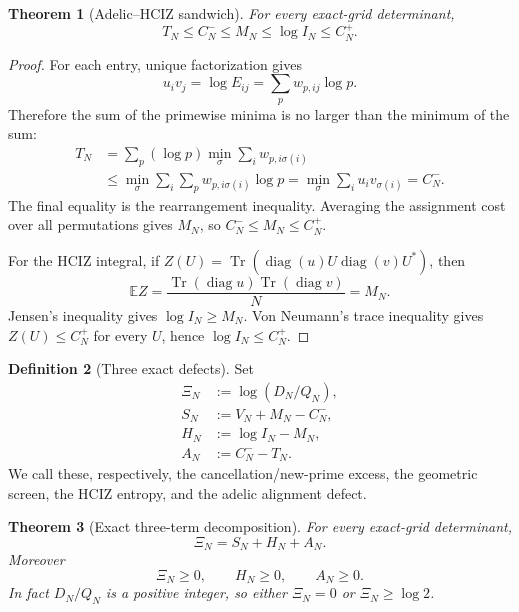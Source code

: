 \documentclass[11pt]{article}
\newcommand{\E}{\mathbb E}
\newcommand{\Tr}{\operatorname{Tr}}
\newcommand{\diag}{\operatorname{diag}}
\newcommand{\1}{\mathbf 1}
\theoremstyle{plain}
\newtheorem{theorem}{Theorem}[section]
\theoremstyle{definition}
\newtheorem{definition}[theorem]{Definition}
\theoremstyle{remark}
\begin{document}
\begin{theorem}[Adelic--HCIZ sandwich]\label{thm:sandwich}
For every exact-grid determinant,
\begin{equation}\label{eq:master-sandwich}
 \boxed{\quad
 T_N\le C_N^-\le M_N\le\log I_N\le C_N^+.
 \quad}
\end{equation}
\end{theorem}

\begin{proof}
For each entry, unique factorization gives
\[
 u_iv_j=\log E_{ij}=\sum_pw_{p,ij}\log p.
\]
Therefore the sum of the primewise minima is no larger than the minimum of
the sum:
\begin{align*}
 T_N
 &=\sum_p(\log p)\min_\sigma\sum_iw_{p,i\sigma(i)}\\
 &\le\min_\sigma\sum_i\sum_p w_{p,i\sigma(i)}\log p
 =\min_\sigma\sum_i u_iv_{\sigma(i)}=C_N^-.
\end{align*}
The final equality is the rearrangement inequality.  Averaging the assignment
cost over all permutations gives $M_N$, so $C_N^-\le M_N\le C_N^+$.

For the HCIZ integral, if
$Z(U)=\Tr(\diag(u)U\diag(v)U^*)$, then
\[
 \E Z=\frac{\Tr(\diag u)\Tr(\diag v)}N=M_N.
\]
Jensen's inequality gives $\log I_N\ge M_N$.  Von Neumann's trace inequality
gives $Z(U)\le C_N^+$ for every $U$, hence $\log I_N\le C_N^+$.
\end{proof}

\begin{definition}[Three exact defects]\label{def:defects}
Set
\begin{align}
 \Xi_N&:=\log(D_N/Q_N),\label{eq:Xi}\\
 S_N&:=V_N+M_N-C_N^-,\label{eq:screen-finite}\\
 H_N&:=\log I_N-M_N,\label{eq:entropy}\\
 A_N&:=C_N^--T_N.\label{eq:alignment}
\end{align}
We call these, respectively, the cancellation/new-prime excess, the geometric
screen, the HCIZ entropy, and the adelic alignment defect.
\end{definition}

\begin{theorem}[Exact three-term decomposition]\label{thm:decomposition}
For every exact-grid determinant,
\begin{equation}\label{eq:exact-decomposition}
 \boxed{\qquad \Xi_N=S_N+H_N+A_N.\qquad}
\end{equation}
Moreover
\[
 \Xi_N\ge0,
 \qquad H_N\ge0,
 \qquad A_N\ge0.
\]
In fact $D_N/Q_N$ is a positive integer, so either $\Xi_N=0$ or
$\Xi_N\ge\log2$.
\end{theorem}
\end{document}
